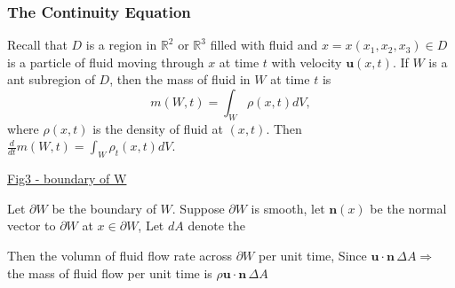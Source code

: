 \subsubsection{The Continuity Equation} %

Recall that $D$ is a region in $\mathbb{R}^2$ or $\mathbb{R}^3$ filled with fluid and $x=x(x_1,x_2,x_3)\in D$ is a particle of fluid moving through $x$ at time $t$ with velocity $\textbf{u}(x,t)$. If $W$ is a ant subregion of $D$, then  the mass of fluid in $W$ at time $t$ is 
\begin{equation}
m(W,t) = \int_{W} \rho(x,t)dV,
\end{equation}
where $\rho(x,t)$ is the density of fluid at $(x,t)$. Then $\displaystyle \frac{d}{dt}m(W,t) = \int_W \rho_t (x,t) dV$​.

\underline{Fig3 - boundary of W}

Let $\partial W$ be the boundary of $W$. Suppose $\partial W$ is smooth, let $\textbf{n}(x)$ be the normal vector to $\partial W$ at $x\in \partial W$, Let $dA$ denote the 

Then the volumn of fluid flow rate across $\partial W$ per unit time, Since $\textbf{u}\cdot \textbf{n}\, \Delta A$$\Rightarrow$ the mass of fluid flow per unit time is $\rho \textbf{u}\cdot \textbf{n}\, \Delta A$

